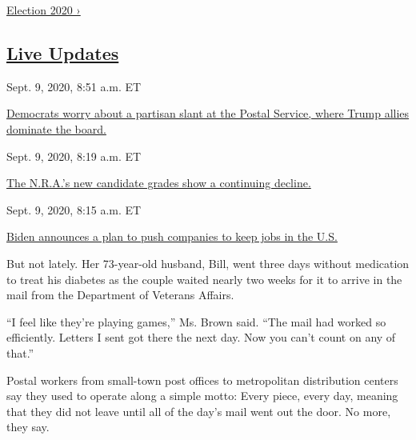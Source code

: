\href{https://www.nytimes3xbfgragh.onion/news-event/2020-election}{Election
2020 ›}

\hypertarget{live-updates}{%
\subsection{\texorpdfstring{\href{https://www.nytimes3xbfgragh.onion/live/2020/09/09/us/trump-vs-biden}{Live
Updates}}{Live Updates}}\label{live-updates}}

\href{https://www.nytimes3xbfgragh.onion/live/2020/09/09/us/trump-vs-biden\#democrats-worry-about-a-partisan-slant-at-the-postal-service-where-trump-allies-dominate-the-board}{}

Sept. 9, 2020, 8:51 a.m. ET

\href{https://www.nytimes3xbfgragh.onion/live/2020/09/09/us/trump-vs-biden\#democrats-worry-about-a-partisan-slant-at-the-postal-service-where-trump-allies-dominate-the-board}{Democrats
worry about a partisan slant at the Postal Service, where Trump allies
dominate the
board.}\href{https://www.nytimes3xbfgragh.onion/live/2020/09/09/us/trump-vs-biden\#the-nras-new-candidate-grades-show-a-continuing-decline}{}

Sept. 9, 2020, 8:19 a.m. ET

\href{https://www.nytimes3xbfgragh.onion/live/2020/09/09/us/trump-vs-biden\#the-nras-new-candidate-grades-show-a-continuing-decline}{The
N.R.A.'s new candidate grades show a continuing
decline.}\href{https://www.nytimes3xbfgragh.onion/live/2020/09/09/us/trump-vs-biden\#biden-announces-a-plan-to-push-companies-to-keep-jobs-in-the-us}{}

Sept. 9, 2020, 8:15 a.m. ET

\href{https://www.nytimes3xbfgragh.onion/live/2020/09/09/us/trump-vs-biden\#biden-announces-a-plan-to-push-companies-to-keep-jobs-in-the-us}{Biden
announces a plan to push companies to keep jobs in the U.S.}

But not lately. Her 73-year-old husband, Bill, went three days without
medication to treat his diabetes as the couple waited nearly two weeks
for it to arrive in the mail from the Department of Veterans Affairs.

``I feel like they're playing games,'' Ms. Brown said. ``The mail had
worked so efficiently. Letters I sent got there the next day. Now you
can't count on any of that.''

Postal workers from small-town post offices to metropolitan distribution
centers say they used to operate along a simple motto: Every piece,
every day, meaning that they did not leave until all of the day's mail
went out the door. No more, they say.

